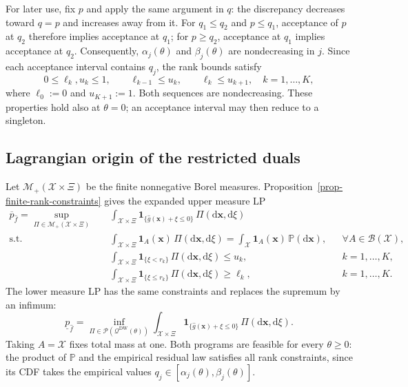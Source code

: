 For later use, fix $p$ and apply the same argument in $q$: the discrepancy decreases toward $q=p$ and increases away from it. For $q_1\le q_2$ and $p\le q_1$, acceptance of $p$ at $q_2$ therefore implies acceptance at $q_1$; for $p\ge q_2$, acceptance at $q_1$ implies acceptance at $q_2$. Consequently, $\alpha_j(\theta)$ and $\beta_j(\theta)$ are nondecreasing in $j$. Since each acceptance interval contains $q_j$, the rank bounds satisfy
\begin{equation}
  0\le\ell_k,u_k\le1,\qquad
  \ell_{k-1}\le u_k,\qquad \ell_k\le u_{k+1},
  \quad k=1,\ldots,K,
  \label{eq-app-rank-compatibility}
\end{equation}
where $\ell_0:=0$ and $u_{K+1}:=1$. Both sequences are nondecreasing. These properties hold also at $\theta=0$; an acceptance interval may then reduce to a singleton.

\subsection{Lagrangian origin of the restricted duals}
\label{app-restricted-lagrangian}

Let $\mathcal M_+(\mathcal X\times\Xi)$ be the finite nonnegative Borel measures. Proposition~\ref{prop-finite-rank-constraints} gives the expanded upper measure LP
\begin{equation}
  \begin{aligned}
    \overline p_{\hat f}
    =\sup_{\Pi\in\mathcal M_+(\mathcal X\times\Xi)}\quad&
    \int_{\mathcal X\times\Xi}\mathbf1_{\{\hat g(\bm x)+\xi\le0\}}\,\Pi\left(\mathrm d\bm x,\mathrm d\xi\right)\\
    \text{s.t.}\quad&
    \int_{\mathcal X\times\Xi}\mathbf1_A(\bm x)\,\Pi\left(\mathrm d\bm x,\mathrm d\xi\right)
    =\int_{\mathcal X}\mathbf1_A(\bm x)\,\mathbb P\left(\mathrm d\bm x\right),
    &&\forall A\in\mathcal B(\mathcal X),\\
    &\int_{\mathcal X\times\Xi}\mathbf1_{\{\xi<r_k\}}\,\Pi\left(\mathrm d\bm x,\mathrm d\xi\right)\le u_k,
    &&k=1,\ldots,K,\\
    &\int_{\mathcal X\times\Xi}\mathbf1_{\{\xi\le r_k\}}\,\Pi\left(\mathrm d\bm x,\mathrm d\xi\right)\ge\ell_k,
    &&k=1,\ldots,K.
  \end{aligned}
  \label{eq-measure-upper}
\end{equation}
The lower measure LP has the same constraints and replaces the supremum by an infimum:
\begin{equation}
  \underline p_{\hat f}
  =\inf_{\Pi\in\mathscr P\left(\mathscr Q^{\mathrm{DW}}(\theta)\right)}
  \int_{\mathcal X\times\Xi}\mathbf1_{\{\hat g(\bm x)+\xi\le0\}}\,\Pi\left(\mathrm d\bm x,\mathrm d\xi\right).
  \label{eq-measure-lower}
\end{equation}
Taking $A=\mathcal X$ fixes total mass at one. Both programs are feasible for every $\theta\ge0$: the product of $\mathbb P$ and the empirical residual law satisfies all rank constraints, since its CDF takes the empirical values $q_j\in[\alpha_j(\theta),\beta_j(\theta)]$.

